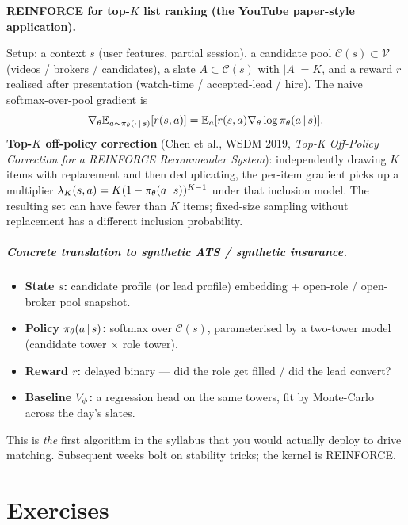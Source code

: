 \documentclass[11pt,oneside]{scrbook}
\begin{document}
\begin{matching}
\textbf{REINFORCE for top-$K$ list ranking (the YouTube paper-style application).}

Setup: a context $s$ (user features, partial session), a candidate pool $\mathcal{C}(s)\subset \mathcal{V}$ (videos / brokers / candidates), a slate $A \subset \mathcal{C}(s)$ with $|A|=K$, and a reward $r$ realised after presentation (watch-time / accepted-lead / hire). The naive softmax-over-pool gradient is
\[
  \nabla_\theta \mathbb{E}_{a\sim\pi_\theta(\cdot\,\vert\, s)}[r(s,a)] = \mathbb{E}_{a}[r(s,a) \nabla_\theta \log\pi_\theta(a\,\vert\, s)].
\]
\textbf{Top-$K$ off-policy correction} (Chen et al., WSDM 2019, \emph{Top-K Off-Policy Correction for a REINFORCE Recommender System}): independently drawing $K$ items with replacement and then deduplicating,
the per-item gradient picks up a multiplier $\lambda_K(s,a) = K(1-\pi_\theta(a\,\vert\, s))^{K-1}$ under that inclusion model. The resulting set can have fewer than $K$
items; fixed-size sampling without replacement has a different inclusion probability.

\paragraph{Concrete translation to synthetic ATS / synthetic insurance.}
\begin{itemize}
  \item \textbf{State $s$:} candidate profile (or lead profile) embedding + open-role / open-broker pool snapshot.
  \item \textbf{Policy $\pi_\theta(a\,\vert\, s)$:} softmax over $\mathcal{C}(s)$, parameterised by a two-tower model (candidate tower $\times$ role tower).
  \item \textbf{Reward $r$:} delayed binary --- did the role get filled / did the lead convert?
  \item \textbf{Baseline $V_\phi$:} a regression head on the same towers, fit by Monte-Carlo across the day's slates.
\end{itemize}
This is \emph{the} first algorithm in the syllabus that you would actually deploy to drive matching. Subsequent weeks bolt on stability tricks; the kernel is REINFORCE.
\end{matching}

\chapter{Exercises}
\end{document}
